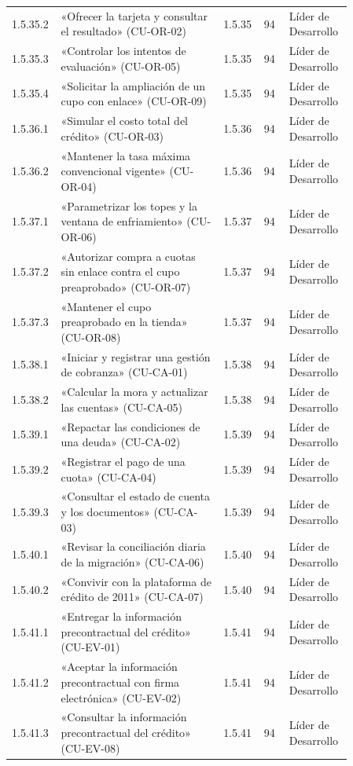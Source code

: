 \begin{longtable}{@{}p{0.075\linewidth}p{0.451\linewidth}p{0.075\linewidth}p{0.075\linewidth}p{0.179\linewidth}@{}}
1.5.35.2 & «Ofrecer la tarjeta y consultar el resultado» (CU-OR-02) & 1.5.35 & 94 & Líder de Desarrollo \\
1.5.35.3 & «Controlar los intentos de evaluación» (CU-OR-05) & 1.5.35 & 94 & Líder de Desarrollo \\
1.5.35.4 & «Solicitar la ampliación de un cupo con enlace» (CU-OR-09) & 1.5.35 & 94 & Líder de Desarrollo \\
1.5.36.1 & «Simular el costo total del crédito» (CU-OR-03) & 1.5.36 & 94 & Líder de Desarrollo \\
1.5.36.2 & «Mantener la tasa máxima convencional vigente» (CU-OR-04) & 1.5.36 & 94 & Líder de Desarrollo \\
1.5.37.1 & «Parametrizar los topes y la ventana de enfriamiento» (CU-OR-06) & 1.5.37 & 94 & Líder de Desarrollo \\
1.5.37.2 & «Autorizar compra a cuotas sin enlace contra el cupo preaprobado» (CU-OR-07) & 1.5.37 & 94 & Líder de Desarrollo \\
1.5.37.3 & «Mantener el cupo preaprobado en la tienda» (CU-OR-08) & 1.5.37 & 94 & Líder de Desarrollo \\
1.5.38.1 & «Iniciar y registrar una gestión de cobranza» (CU-CA-01) & 1.5.38 & 94 & Líder de Desarrollo \\
1.5.38.2 & «Calcular la mora y actualizar las cuentas» (CU-CA-05) & 1.5.38 & 94 & Líder de Desarrollo \\
1.5.39.1 & «Repactar las condiciones de una deuda» (CU-CA-02) & 1.5.39 & 94 & Líder de Desarrollo \\
1.5.39.2 & «Registrar el pago de una cuota» (CU-CA-04) & 1.5.39 & 94 & Líder de Desarrollo \\
1.5.39.3 & «Consultar el estado de cuenta y los documentos» (CU-CA-03) & 1.5.39 & 94 & Líder de Desarrollo \\
1.5.40.1 & «Revisar la conciliación diaria de la migración» (CU-CA-06) & 1.5.40 & 94 & Líder de Desarrollo \\
1.5.40.2 & «Convivir con la plataforma de crédito de 2011» (CU-CA-07) & 1.5.40 & 94 & Líder de Desarrollo \\
1.5.41.1 & «Entregar la información precontractual del crédito» (CU-EV-01) & 1.5.41 & 94 & Líder de Desarrollo \\
1.5.41.2 & «Aceptar la información precontractual con firma electrónica» (CU-EV-02) & 1.5.41 & 94 & Líder de Desarrollo \\
1.5.41.3 & «Consultar la información precontractual del crédito» (CU-EV-08) & 1.5.41 & 94 & Líder de Desarrollo \\

\end{longtable}
